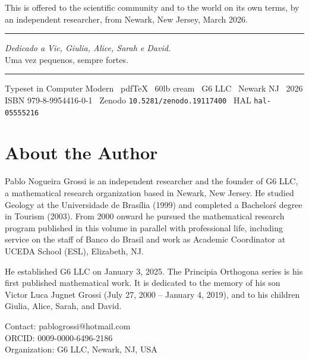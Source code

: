 \documentclass[12pt, oneside]{book}
\theoremstyle{plain}
\theoremstyle{definition}
\theoremstyle{remark}
\begin{document}
\vspace{0.3cm}

\noindent This is offered to the scientific community and to the world
on its own terms, by an independent researcher,
from Newark, New Jersey, March 2026.

\vspace{0.8cm}

\begin{center}
\rule{0.5\textwidth}{0.4pt}

\vspace{0.4cm}

\textit{Dedicado a Vic, Giulia, Alice, Sarah e David.}\\[0.3em]
{\small Uma vez pequenos, sempre fortes.}

\vspace{0.4cm}

\rule{0.5\textwidth}{0.2pt}

\vspace{0.3cm}

{\scriptsize\color{gray}
Typeset in Computer Modern \textperiodcentered\ pdfTeX \textperiodcentered\
60lb cream \textperiodcentered\ G6 LLC \textperiodcentered\ Newark NJ \textperiodcentered\ 2026\\
ISBN 979-8-9954416-0-1 \textperiodcentered\ Zenodo \texttt{10.5281/zenodo.19117400}
\textperiodcentered\ HAL \texttt{hal-05555216}}
\end{center}

\backmatter

\chapter*{About the Author}

Pablo Nogueira Grossi is an independent researcher and the founder of G6 LLC,
a mathematical research organization based in Newark, New Jersey. He studied
Geology at the Universidade de Bras\'ilia (1999) and completed a Bachelor\'s
degree in Tourism (2003). From 2000 onward he pursued the mathematical research
program published in this volume in parallel with professional life, including
service on the staff of Banco do Brasil and work as Academic Coordinator at
UCEDA School (ESL), Elizabeth, NJ.

He established G6 LLC on January 3, 2025. The Principia Orthogona series is
his first published mathematical work. It is dedicated to the memory of his
son Victor Luca Jugnet Grossi (July 27, 2000 -- January 4, 2019), and to his
children Giulia, Alice, Sarah, and David.

\bigskip
\noindent Contact: pablogrossi@hotmail.com\\
ORCID: 0009-0000-6496-2186\\
Organization: G6 LLC, Newark, NJ, USA
\end{document}
